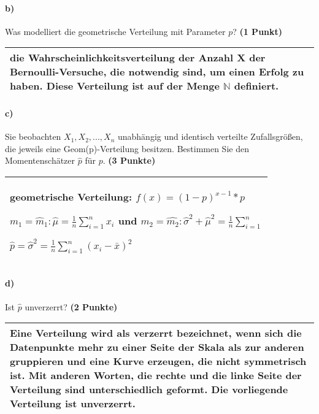 \documentclass[10pt, a4paper]{article}
\begin{document}
\paragraph{b)} Was modelliert die geometrische Verteilung mit Parameter $p$? \textbf{(1 Punkt)}\\
\begin{tabular}{| p{17cm} |}
    \hline
    die Wahrscheinlichkeitsverteilung der Anzahl X der Bernoulli-Versuche, die notwendig sind, um einen Erfolg zu haben. Diese Verteilung ist auf der Menge $\mathbb{N}$ definiert.
    \\\hline
\end{tabular}

\paragraph{c)} Sie beobachten $X_1,X_2,...,X_n$ unabhängig und identisch verteilte Zufallsgrößen, die jeweils eine Geom(p)-Verteilung besitzen. Bestimmen Sie den Momentenschätzer $\hat{p}$ für $p$. \textbf{(3 Punkte)}\\
\begin{tabular}{| p{17cm} |}
    \hline
    geometrische Verteilung: $f(x)=(1-p)^{x-1}*p$
    
    $m_1=\hat{m}_1: \hat{\mu}=\frac{1}{n} \sum_{i=1}^{n} x_i$ und $m_2=\hat{m_2}:\hat{\sigma}^2+\hat{\mu}^2 =\frac{1}{n} \sum_{i=1}^{n}$

    $\hat{p} = \hat{\sigma}^2=\frac{1}{n}\sum_{i=1}^n (x_i-\bar{x})^2$

    \\\hline
\end{tabular}

\paragraph{d)} Ist $\hat{p}$ unverzerrt? \textbf{(2 Punkte)}\\
\begin{tabular}{| p{17cm} |}
    \hline
    Eine Verteilung wird als verzerrt bezeichnet, wenn sich die Datenpunkte mehr zu einer Seite der Skala als zur anderen gruppieren und eine Kurve erzeugen, die nicht symmetrisch ist. Mit anderen Worten, die rechte und die linke Seite der Verteilung sind unterschiedlich geformt. Die vorliegende Verteilung ist unverzerrt.
    \\\hline
\end{tabular}
\end{document}
